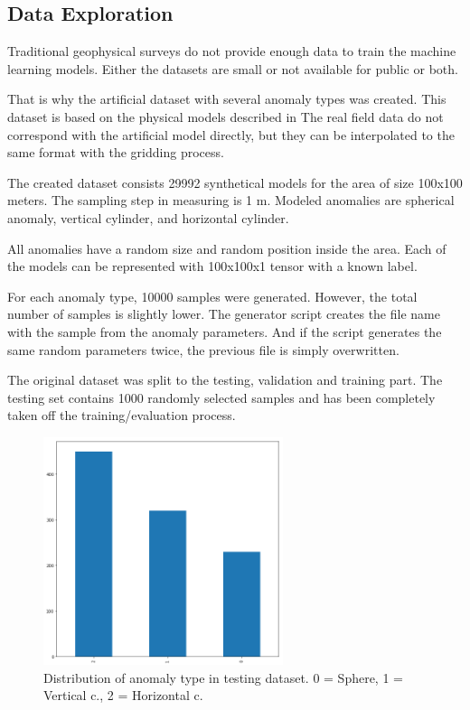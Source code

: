 \documentclass{article}
\begin{document}
\subsection{Data Exploration}\label{data-exploration}

Traditional geophysical surveys do not provide enough data to train the
machine learning models. Either the datasets are small or not available
for public or both.

That is why the artificial dataset with several anomaly types was
created. This dataset is based on the physical models described in \cite{salem}
The real field data do not correspond with the artificial model
directly, but they can be interpolated to the same format with the
gridding process.

The created dataset consists 29992 synthetical models for the area of
size 100x100 meters. The sampling step in measuring is 1 m. Modeled
anomalies are spherical anomaly, vertical cylinder, and horizontal
cylinder.

All anomalies have a random size and random position inside the area.
Each of the models can be represented with 100x100x1 tensor with a known
label.

For each anomaly type, 10000 samples were generated. However, the total
number of samples is slightly lower. The generator script creates the
file name with the sample from the anomaly parameters. And if the script
generates the same random parameters twice, the previous file is simply
overwritten.

The original dataset was split to the testing, validation and training
part. The testing set contains 1000 randomly selected samples and has
been completely taken off the training/evaluation process.

\begin{figure}[!htp]
\centerline{\includegraphics[width=7cm]{img/test_set_frequency.png}}
\renewcommand{\figurename}{Figure}
\caption[Distribution of anomaly type in testing dataset. 0 =
Sphere, 1 = Vertical c., 2 = Horizontal c.]{Distribution of anomaly type in testing dataset. 0 =
Sphere, 1 = Vertical c., 2 = Horizontal c.}
\label{fig:SphericalAnomalyDefinition}
\end{figure}
\end{document}
